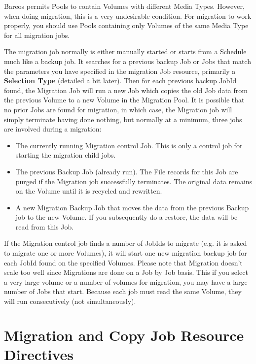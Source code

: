 Bareos permits Pools to contain Volumes with different Media Types.
However, when doing migration, this is a very undesirable condition.  For
migration to work properly, you should use Pools containing only Volumes of
the same Media Type for all migration jobs.

The migration job normally is either manually started or starts
from a Schedule much like a backup job. It searches
for a previous backup Job or Jobs that match the parameters you have
specified in the migration Job resource, primarily a {\bf Selection Type}
(detailed a bit later).  Then for
each previous backup JobId found, the Migration Job will run a new Job which
copies the old Job data from the previous Volume to a new Volume in
the Migration Pool.  It is possible that no prior Jobs are found for
migration, in which case, the Migration job will simply terminate having
done nothing, but normally at a minimum, three jobs are involved during a
migration:

\begin{itemize}
\item The currently running Migration control Job. This is only
      a control job for starting the migration child jobs.
\item The previous Backup Job (already run). The File records
      for this Job are purged if the Migration job successfully
      terminates.  The original data remains on the Volume until
      it is recycled and rewritten.
\item A new Migration Backup Job that moves the data from the
      previous Backup job to the new Volume.  If you subsequently
      do a restore, the data will be read from this Job.
\end{itemize}

If the Migration control job finds a number of JobIds to migrate (e.g.
it is asked to migrate one or more Volumes), it will start one new
migration backup job for each JobId found on the specified Volumes.
Please note that Migration doesn't scale too well since Migrations are
done on a Job by Job basis. This if you select a very large volume or
a number of volumes for migration, you may have a large number of
Jobs that start. Because each job must read the same Volume, they will
run consecutively (not simultaneously).

\section{Migration and Copy Job Resource Directives}

